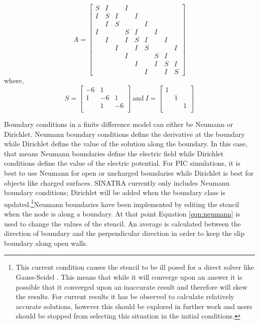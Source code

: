 \begin{equation}
\label{eqn:stencil}
A = 
\begin{bmatrix}
S & I &  & I &  &  &  &  & \\ 
I & S &I  &  & I &  &  &  & \\ 
 & I & S &  &  &I  &  &  & \\ 
I &  &  & S & I &  &I &  & \\ 
 & I &  & I & S & I &  &I  & \\ 
 &  & I &  & I & S &  &  & I\\ 
 &  &  & I &  &  & S & I & \\ 
 &  &  &  & I &  & I & S & I\\ 
 &  &  &  &  & I &  & I & S
\end{bmatrix}
\end{equation}
where,
\begin{equation} \nonumber
S = 
\begin{bmatrix}
-6 & 1 & \\
1 & -6 & 1\\
 & 1 & -6 \\
\end{bmatrix}
\ \text{and} \ I = 
\begin{bmatrix}
1 &  & \\
 & 1 & \\
 & & 1 \\
\end{bmatrix}
\end{equation}

\indent Boundary conditions in a finite difference model can either be Neumann or Dirichlet. Neumann boundary conditions define the derivative at the boundary while Dirichlet define the value of the solution along the boundary. In this case, that means Neumann boundaries define the electric field while Dirichlet conditions define the value of the electric potential. For PIC simulations, it is best to use Neumann for open or uncharged boundaries while Dirichlet is best for objects like charged surfaces. SINATRA currently only includes Neumann boundary conditions; Dirichlet will be added when the boundary class is updated.\footnote{This current condition causes the stencil to be ill posed for a direct solver like Gauss-Seidel \cite{bvp_neumann}. This means that while it will converge upon an answer it is possible that it converged upon an inaccurate result and therefore will skew the results. For current results it has be observed to calculate relatively accurate solutions, however this should be explored in further work and users should be stopped from selecting this situation in the initial conditions.}Neumann boundaries have been implemented by editing the stencil when the node is along a boundary. At that point Equation \ref{eqn:neumann} is used to change the values of the stencil. An average is calculated between the direction of boundary and the perpendicular direction in order to keep the slip boundary along open walls. \par

